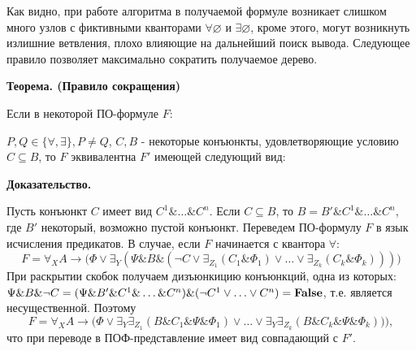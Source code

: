 \documentclass[a4paper,12pt]{article}
\begin{document}
Как видно, при работе алгоритма в получаемой формуле возникает слишком много узлов с фиктивными кванторами $\forall\varnothing$ и $\exists\varnothing$, кроме этого, могут возникнуть излишние ветвления, плохо влияющие на дальнейший поиск вывода. Следующее правило позволяет максимально сократить получаемое дерево.

\textbf{Теорема. (Правило сокращения)}

Если в некоторой ПО-формуле $F$:
\begin{center}
\end{center}
$P,Q\in\{\forall,\exists\}, P\neq Q$, $C,B$ - некоторые конъюнкты, удовлетворяющие условию $C\subseteq B$, то $F$ эквивалентна $F'$ имеющей следующий вид:

\begin{center}
\end{center}

\textbf{Доказательство.}

Пусть конъюнкт $C$ имеет вид $C^1\&\ldots\& C^n$. Если $C\subseteq B$, то $B = B'\&C^1\&\ldots\& C^n$, где $B'$ некоторый, возможно пустой конъюнкт. Переведем ПО-формулу $F$ в язык исчисления предикатов. В случае, если $F$ начинается с квантора $\forall$:
$$F = \forall_X A\rightarrow\bigl(\Phi\vee\exists_Y(\Psi\& B\&(\neg C\vee\exists_{Z_1}(C_1\&\Phi_1)\vee\ldots\vee\exists_{Z_k}(C_k\&\Phi_k)))\bigr)$$
При раскрытии скобок получаем дизъюнкицию конъюнкций, одна из которых: $\Psi\&B\&\neg C = (\Psi\&B'\&C^1\&\ldots\& C^n)\&(\neg C^1\vee\ldots\vee C^n) = \text{\textbf{False}}$, т.е. является несущественной. Поэтому
$$F = \forall_X A\rightarrow\bigl(\Phi\vee\exists_Y\exists_{Z_1}(B\&C_1\&\Psi\&\Phi_1)\vee\ldots\vee\exists_Y\exists_{Z_k}(B\&C_k\&\Psi\&\Phi_k))\bigr),$$
что при переводе в ПОФ-представление имеет вид совпадающий с $F'$.
\end{document}
